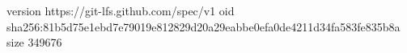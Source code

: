 version https://git-lfs.github.com/spec/v1
oid sha256:81b5d75e1ebd7e79019e812829d20a29eabbe0efa0de4211d34fa583fe835b8a
size 349676
